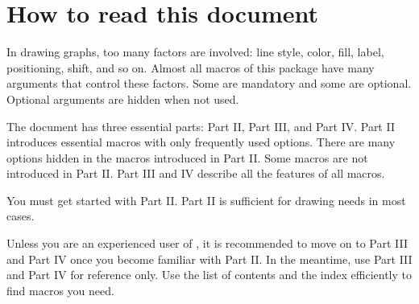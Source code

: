 \begin{tzcode}{1}
\end{tzcode}

\section{How to read this document}

In drawing graphs, too many factors are involved: line style, color, fill, label, positioning, shift, and so on.
Almost all macros of this package have many arguments that control these factors.
Some are mandatory and some are optional.
Optional arguments are hidden when not used.

The document has three essential parts: Part II, Part III, and Part IV.
Part II introduces essential macros with only frequently used options.
There are many options hidden in the macros introduced in Part II.
Some macros are not introduced in Part II.
Part III and IV describe all the features of all macros.

You must get started with Part II.
Part II is sufficient for drawing needs in most cases.

Unless you are an experienced user of \Tikz, it is recommended to move on to Part III and Part IV once you become familiar with Part II. In the meantime, use Part III and Part IV for reference only. Use the list of contents and the index efficiently to find macros you need.


